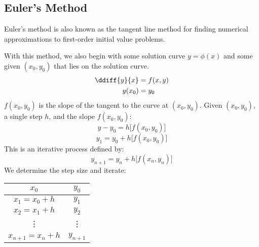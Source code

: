 \documentclass{math}
\begin{document}
\subsection*{Euler's Method}
Euler's method is also known as the tangent line method for finding numerical
approximations to first-order initial value problems.
\begin{center}
\end{center}
With this method, we also begin with some solution curve \( y = \phi(x) \) and
some given \( (x_0,y_0) \) that lies on the solution curve.
\begin{align*}
  \ddiff{y}{x} &= f(x,y) \\
  y(x_0) &= y_0
\end{align*}
\( f(x_0,y_0) \) is the slope of the tangent to the curve at \( (x_0,y_0) \).
Given \( (x_0,y_0) \), a single step \( h \), and the slope \( f(x_0,y_0) \):
\[ y-y_0 = h\big[f(x_0,y_0)\big] \]
\[ y_1 = y_0+h\big[f(x_0,y_0)\big] \]
This is an iterative process defined by:
\[ y_{n+1} = y_n+h\big[f(x_n,y_n)\big] \]
We determine the step size and iterate:
\begin{center}
  \begin{tabular}{|c|c|}
    \hline
    \( x_0 \) & \( y_0 \) \\
    \hline
    \( x_1 = x_0+h \) & \( y_1 \) \\
    \hline
    \( x_2 = x_1+h \) & \( y_2 \) \\
    \hline
    \vdots & \vdots \\
    \hline
    \( x_{n+1} = x_n+h \) & \( y_{n+1} \) \\
    \hline
  \end{tabular}
\end{center}
\end{document}
